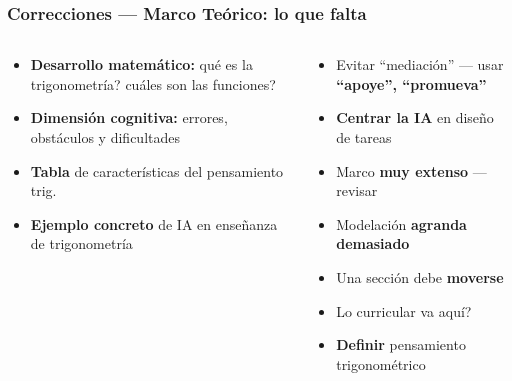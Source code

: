 \documentclass[11pt, aspectratio=169, spanish]{beamer}
\begin{document}
\begin{frame}[plain]
\frametitle{\faBook\quad Correcciones — Marco Teórico: lo que falta}
\vspace{0.08cm}

\begin{columns}[T]

\begin{tcolorbox}[colback=MoradoMarco!5, colframe=MoradoMarco!55, arc=2mm,
  title={\footnotesize\textbf{\faPlusSquare\quad Contenido ausente — crítico}}]
{\footnotesize
\begin{itemize}[leftmargin=*, itemsep=3pt]
  \item \colorbox{RojoAlerta!15}{\textcolor{RojoAlerta}{}}\; \textbf{Desarrollo matemático:} \textquestiondown{}qué es la trigonometría? \textquestiondown{}cuáles son las funciones?
  \item \colorbox{RojoAlerta!15}{\textcolor{RojoAlerta}{}}\; \textbf{Dimensión cognitiva:} errores, obstáculos y dificultades
  \item \colorbox{RojoAlerta!15}{\textcolor{RojoAlerta}{}}\; \textbf{Tabla} de características del pensamiento trig.
  \item \colorbox{RojoAlerta!15}{\textcolor{RojoAlerta}{}}\; \textbf{Ejemplo concreto} de IA en enseñanza de trigonometría
\end{itemize}}
\end{tcolorbox}


\begin{tcolorbox}[colback=MoradoMarco!5, colframe=MoradoMarco!55, arc=2mm,
  title={\footnotesize\textbf{\faSlidersH\quad Ajustes de enfoque}}]
{\footnotesize
\begin{itemize}[leftmargin=*, itemsep=2pt]
  \item \colorbox{RojoAlerta!15}{\textcolor{RojoAlerta}{}}\; Evitar ``mediación'' — usar \textbf{``apoye'', ``promueva''}
  \item \colorbox{RojoAlerta!15}{\textcolor{RojoAlerta}{}}\; \textbf{Centrar la IA} en diseño de tareas
  \item \colorbox{RojoAlerta!15}{\textcolor{RojoAlerta}{}}\; Marco \textbf{muy extenso} — revisar
  \item \colorbox{RojoAlerta!15}{\textcolor{RojoAlerta}{}}\; Modelación \textbf{agranda demasiado}
  \item \colorbox{RojoAlerta!15}{\textcolor{RojoAlerta}{}}\; Una sección debe \textbf{moverse}
  \item \colorbox{RojoAlerta!15}{\textcolor{RojoAlerta}{}}\; \textquestiondown{}Lo curricular va aquí?
  \item \colorbox{RojoAlerta!15}{\textcolor{RojoAlerta}{}}\; \textbf{Definir} pensamiento trigonométrico
\end{itemize}}
\end{tcolorbox}


\end{columns}
\end{frame}
\end{document}
